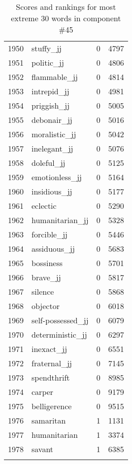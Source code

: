 \begin{longtable}[!htbp]{| rlr@{.}l |}
    1950 & stuffy\_jj & 0 & 4797 \\
    1951 & politic\_jj & 0 & 4806 \\
    1952 & flammable\_jj & 0 & 4814 \\
    1953 & intrepid\_jj & 0 & 4981 \\
    1954 & priggish\_jj & 0 & 5005 \\
    1955 & debonair\_jj & 0 & 5016 \\
    1956 & moralistic\_jj & 0 & 5042 \\
    1957 & inelegant\_jj & 0 & 5076 \\
    1958 & doleful\_jj & 0 & 5125 \\
    1959 & emotionless\_jj & 0 & 5164 \\
    1960 & insidious\_jj & 0 & 5177 \\
    1961 & eclectic & 0 & 5290 \\
    1962 & humanitarian\_jj & 0 & 5328 \\
    1963 & forcible\_jj & 0 & 5446 \\
    1964 & assiduous\_jj & 0 & 5683 \\
    1965 & bossiness & 0 & 5701 \\
    1966 & brave\_jj & 0 & 5817 \\
    1967 & silence & 0 & 5868 \\
    1968 & objector & 0 & 6018 \\
    1969 & self-possessed\_jj & 0 & 6079 \\
    1970 & deterministic\_jj & 0 & 6297 \\
    1971 & inexact\_jj & 0 & 6551 \\
    1972 & fraternal\_jj & 0 & 7145 \\
    1973 & spendthrift & 0 & 8985 \\
    1974 & carper & 0 & 9179 \\
    1975 & belligerence & 0 & 9515 \\
    1976 & samaritan & 1 & 1131 \\
    1977 & humanitarian & 1 & 3374 \\
    1978 & savant & 1 & 6385 \\
    \hline
    \caption{Scores and rankings for most extreme 30 words in component \#45} \\
\end{longtable}
